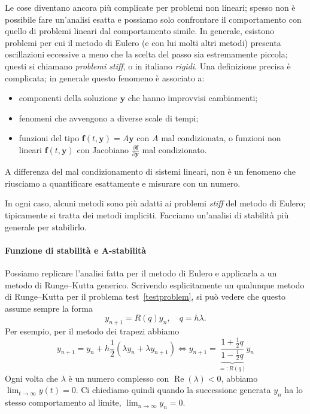 \documentclass[a4paper]{report}
\theoremstyle{definiton}
\theoremstyle{remark}
\newcommand{\y}{\mathbf{y}}
\begin{document}
Le cose diventano ancora più complicate per problemi non lineari; spesso non è possibile fare un'analisi esatta e possiamo solo confrontare il comportamento con quello di problemi lineari dal comportamento simile. In generale, esistono problemi per cui il metodo di Eulero (e con lui molti altri metodi) presenta oscillazioni eccessive a meno che la scelta del passo sia estremamente piccola; questi si chiamano \emph{problemi stiff}, o in italiano \emph{rigidi}. Una definizione precisa è complicata; in generale questo fenomeno è associato a:
\begin{itemize}
    \item componenti della soluzione $\y$ che hanno improvvisi cambiamenti;
    \item fenomeni che avvengono a diverse scale di tempi;
    \item funzioni del tipo $\mathbf{f}(t,\y)=A\y$ con $A$ mal condizionata, o funzioni non lineari $\mathbf{f}(t,\y)$ con Jacobiano $\frac{\partial \mathbf{f}}{\partial \mathbf{y}}$ mal condizionato.
\end{itemize}
A differenza del mal condizionamento di sistemi lineari, non è un fenomeno che riusciamo a quantificare esattamente e misurare con un numero.

In ogni caso, alcuni metodi sono più adatti ai problemi \emph{stiff} del metodo di Eulero; tipicamente si tratta dei metodi impliciti. Facciamo un'analisi di stabilità più generale per stabilirlo.

\paragraph{Funzione di stabilità e A-stabilità}

Possiamo replicare l'analisi fatta per il metodo di Eulero e applicarla a un metodo di Runge--Kutta generico. Scrivendo esplicitamente un qualunque metodo di Runge--Kutta per il problema test~\eqref{testproblem}, si può vedere che questo assume sempre la forma
\[
y_{n+1} = R(q)y_n, \quad q = h\lambda.
\]
Per esempio, per il metodo dei trapezi abbiamo
\[
y_{n+1} = y_n + h \frac12(\lambda y_n + \lambda y_{n+1}) \iff y_{n+1} = \underbrace{\frac{1+\frac12 q}{1-\frac12q}}_{=:R(q)}y_n
\]
Ogni volta che $\lambda$ è un numero complesso con $\operatorname{Re}(\lambda) < 0$, abbiamo $\lim_{t\to\infty} y(t) = 0$. Ci chiediamo quindi quando la successione generata $y_n$ ha lo stesso comportamento al limite, $\lim_{n\to\infty} y_n = 0$.
\end{document}
